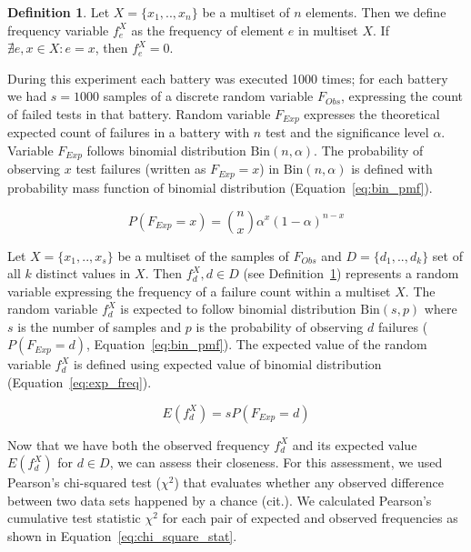 \documentclass[
  digital,  	%
  color,		%
  oneside,   	%
  12pt,
  nocover,
  notable,
  nolof,
  nolot,
]{fithesis3}
\theoremstyle{definition}
\newtheorem{definition}{Definition}[section]
\theoremstyle{remark}
\begin{document}
\begin{definition}
\label{def:freq}
Let $X = \{x_1, .. ,x_n\}$ be a multiset of $n$ elements. Then we define frequency variable $f_{e}^{X}$ as the frequency of element $e$ in multiset $X$. If $\nexists e, x \in X : e = x$, then $f_{e}^{X} = 0$.
\end{definition}

During this experiment each battery was executed 1000 times; for each battery we had $s = 1000$ samples of a discrete random variable $F_{Obs}$, expressing the count of failed tests in that battery. Random variable $F_{Exp}$ expresses the theoretical expected count of failures in a battery with $n$ test and the significance level $\alpha$. Variable $F_{Exp}$ follows binomial distribution $\text{Bin}(n, \alpha)$. The probability of observing $x$ test failures (written as $F_{Exp} = x$) in $\text{Bin}(n, \alpha)$ is defined with probability mass function of binomial distribution (Equation~\ref{eq:bin_pmf}).

\begin{equation}
\label{eq:bin_pmf}
P(F_{Exp} = x) = \binom nx \alpha^x (1-\alpha)^{n-x} 
\end{equation}

Let $X = \{x_1,..,x_s\}$ be a multiset of the samples of $F_{Obs}$ and $D = \{d_1,..,d_k\}$ set of all $k$ distinct values in $X$. Then $f_{d}^{X}, d \in D$ (see Definition~\ref{def:freq}) represents a random variable expressing the frequency of a failure count within a multiset $X$. The random variable $f_{d}^{X}$ is expected to follow binomial distribution $\text{Bin}(s, p)$ where $s$ is the number of samples and $p$ is the probability of observing $d$ failures ($P(F_{Exp} = d)$, Equation~\ref{eq:bin_pmf}). The expected value of the random variable $f_{d}^{X}$ is defined using expected value of binomial distribution (Equation~\ref{eq:exp_freq}).

\begin{equation}
\label{eq:exp_freq}
E\left(f_{d}^{X}\right) = s P(F_{Exp} = d)
\end{equation}

Now that we have both the observed frequency $f_{d}^{X}$ and its expected value $E\left(f_{d}^{X}\right)$ for $d \in D$, we can assess their closeness. For this assessment, we used Pearson's chi-squared test ($\chi^2$) that evaluates whether any observed difference between two data sets happened by a chance (cit.). We calculated Pearson's cumulative test statistic $\chi^2$ for each pair of expected and observed frequencies as shown in Equation~\ref{eq:chi_square_stat}.
\end{document}
